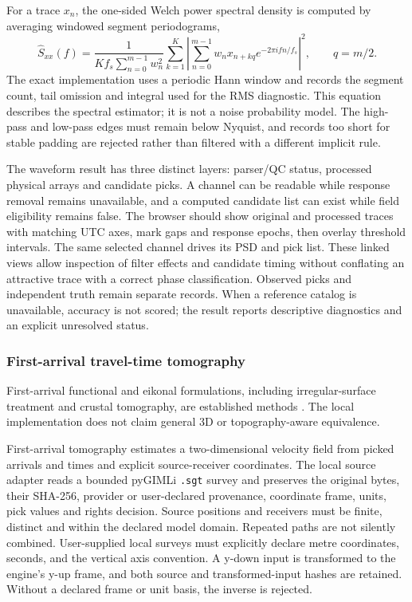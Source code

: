 For a trace \(x_n\), the one-sided Welch power spectral density is
computed by averaging windowed segment periodograms,
\begin{equation}\label{eq:waveform-welch}
 \widehat S_{xx}(f)=
 \frac{1}{K f_s\sum_{n=0}^{m-1}w_n^2}
 \sum_{k=1}^{K}\left|
 \sum_{n=0}^{m-1} w_n x_{n+kq}e^{-2\pi i fn/f_s}
 \right|^2,\qquad q=m/2 .
\end{equation}
The exact implementation uses a periodic Hann window and records the
segment count, tail omission and integral used for the RMS diagnostic.
This equation describes the spectral estimator; it is not a noise
probability model. The high-pass and low-pass edges must remain below
Nyquist, and records too short for stable padding are rejected rather
than filtered with a different implicit rule.

The waveform result has three distinct layers: parser/QC status,
processed physical arrays and candidate picks. A channel can be
readable while response removal remains unavailable, and a computed
candidate list can exist while field eligibility remains false. The
browser should show original and processed traces with matching UTC
axes, mark gaps and response epochs, then overlay threshold intervals.
The same selected channel drives its PSD and pick list. These linked
views allow inspection of filter effects and candidate timing without
conflating an attractive trace with a correct phase classification.
Observed picks and independent truth remain separate records. When a
reference catalog is unavailable, accuracy is not scored; the result
reports descriptive diagnostics and an explicit unresolved status.

\subsubsection{First-arrival travel-time tomography}

First-arrival functional and eikonal formulations, including irregular-surface treatment and crustal tomography, are established methods \cite{gokturkler2009,lan2013,rawlinson2003,sethian1999}. The local implementation does not claim general 3D or topography-aware equivalence.\label{method-traveltime}

First-arrival tomography estimates a two-dimensional velocity field from picked arrivals and
times and explicit source-receiver coordinates. The local source adapter
reads a bounded pyGIMLi \texttt{.sgt} survey and preserves the original
bytes, their SHA-256, provider or user-declared provenance, coordinate
frame, units, pick values and rights decision. Source positions and
receivers must be finite, distinct and within the declared model domain.
Repeated paths are not silently combined. User-supplied local surveys
must explicitly declare metre coordinates, seconds, and the vertical
axis convention. A y-down input is transformed to the engine's y-up
frame, and both source and transformed-input hashes are retained.
Without a declared frame or unit basis, the inverse is rejected.

